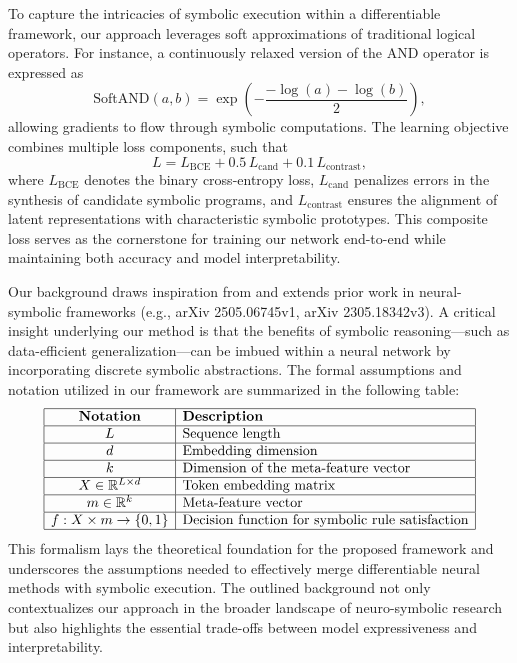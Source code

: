 \documentclass[11pt]{article}
\begin{document}
To capture the intricacies of symbolic execution within a differentiable framework, our approach leverages soft approximations of traditional logical operators. For instance, a continuously relaxed version of the AND operator is expressed as
\[
\text{SoftAND}(a,b) = \exp\left(-\frac{-\log(a) - \log(b)}{2}\right),
\]
allowing gradients to flow through symbolic computations. The learning objective combines multiple loss components, such that
\[
L = L_{\text{BCE}} + 0.5\, L_{\text{cand}} + 0.1\, L_{\text{contrast}},
\]
where \(L_{\text{BCE}}\) denotes the binary cross-entropy loss, \(L_{\text{cand}}\) penalizes errors in the synthesis of candidate symbolic programs, and \(L_{\text{contrast}}\) ensures the alignment of latent representations with characteristic symbolic prototypes. This composite loss serves as the cornerstone for training our network end-to-end while maintaining both accuracy and model interpretability.

Our background draws inspiration from and extends prior work in neural-symbolic frameworks (e.g., arXiv 2505.06745v1, arXiv 2305.18342v3). A critical insight underlying our method is that the benefits of symbolic reasoning—such as data-efficient generalization—can be imbued within a neural network by incorporating discrete symbolic abstractions. The formal assumptions and notation utilized in our framework are summarized in the following table:
\[
\begin{array}{|c|l|}
\hline
\textbf{Notation} & \textbf{Description} \\
\hline
L & \text{Sequence length} \\
\hline
d & \text{Embedding dimension} \\
\hline
k & \text{Dimension of the meta-feature vector} \\
\hline
X \in \mathbb{R}^{L \times d} & \text{Token embedding matrix} \\
\hline
m \in \mathbb{R}^{k} & \text{Meta-feature vector} \\
\hline
f: X \times m \to \{0,1\} & \text{Decision function for symbolic rule satisfaction} \\
\hline
\end{array}
\]
This formalism lays the theoretical foundation for the proposed framework and underscores the assumptions needed to effectively merge differentiable neural methods with symbolic execution. The outlined background not only contextualizes our approach in the broader landscape of neuro-symbolic research but also highlights the essential trade-offs between model expressiveness and interpretability.
\end{document}
